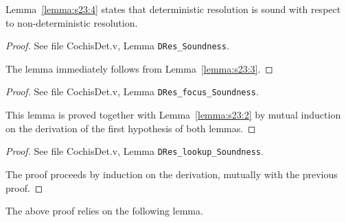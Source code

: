 Lemma~\ref{lemma:s23:4} states that deterministic resolution is
sound with respect to non-deterministic resolution. 

{\centering
{}}
\begin{proof}
See file CochisDet.v, Lemma \texttt{DRes\_Soundness}.

The lemma immediately follows from Lemma~\ref{lemma:s23:3}.
\end{proof} 
{\centering
{}}
\begin{proof}
See file CochisDet.v, Lemma \texttt{DRes\_focus\_Soundness}.

This lemma is proved together with Lemma~\ref{lemma:s23:2} by mutual induction on the derivation of the first hypothesis of both lemmas.
\end{proof}
{\centering
{}}
\begin{proof}
See file CochisDet.v, Lemma \texttt{DRes\_lookup\_Soundness}.

The proof proceeds by induction on the derivation, mutually 
with the previous proof.
\end{proof}
The above proof relies on the following lemma.

